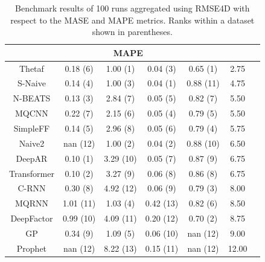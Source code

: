 \begin{table}[htb]
\begin{tabular}{ccccccc}
    \multicolumn{6}{c}{\cellcolor{gray!25}MAPE}                                                                            \\
    \hline
    Thetaf      & 0.18 (6)              & 1.00 (1)               & 0.04 (3)           & 0.65 (1)     & 2.75                \\\hline
    S-Naive     & 0.14 (4)              & 1.00 (3)               & 0.04 (1)           & 0.88 (11)    & 4.75                \\\hline
    N-BEATS     & 0.13 (3)              & 2.84 (7)               & 0.05 (5)           & 0.82 (7)     & 5.50                \\\hline
    MQCNN       & 0.22 (7)              & 2.15 (6)               & 0.05 (4)           & 0.79 (5)     & 5.50                \\\hline
    SimpleFF    & 0.14 (5)              & 2.96 (8)               & 0.05 (6)           & 0.79 (4)     & 5.75                \\\hline
    Naive2      & nan (12)              & 1.00 (2)               & 0.04 (2)           & 0.88 (10)    & 6.50                \\\hline
    DeepAR      & 0.10 (1)              & 3.29 (10)              & 0.05 (7)           & 0.87 (9)     & 6.75                \\\hline
    Transformer & 0.10 (2)              & 3.27 (9)               & 0.06 (8)           & 0.86 (8)     & 6.75                \\\hline
    C-RNN       & 0.30 (8)              & 4.92 (12)              & 0.06 (9)           & 0.79 (3)     & 8.00                \\\hline
    MQRNN       & 1.01 (11)             & 1.03 (4)               & 0.42 (13)          & 0.82 (6)     & 8.50                \\\hline
    DeepFactor  & 0.99 (10)             & 4.09 (11)              & 0.20 (12)          & 0.70 (2)     & 8.75                \\\hline
    GP          & 0.34 (9)              & 1.09 (5)               & 0.06 (10)          & nan (12)     & 9.00                \\\hline
    Prophet     & nan (12)              & 8.22 (13)              & 0.15 (11)          & nan (12)     & 12.00               \\\hline
  \end{tabular}
  \caption{Benchmark results of 100 runs aggregated using RMSE4D with respect to the MASE and MAPE metrics. Ranks within a dataset shown in parentheses.}
  \label{tab:benchmark_results_MASE_MAPE}
\end{table}

